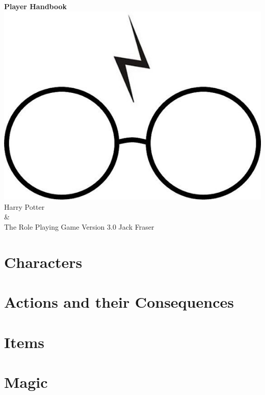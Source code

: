 \documentclass[oneside, twocolumn,9pt]{extbook}
\begin{document}
\begin{titlepage}
    \centering
    \vfill
    {\bfseries
        {\HP \fontsize{40}{35}\selectfont Player Handbook}
    }    
    \vfill
    \includegraphics[scale = 0.7]{../Images/glasses} %
    \vfill
    {\HP \fontsize{30}{24} \selectfont  Harry Potter \\\&\\ The Role Playing Game}
    \normalsize
    \vfill
    {\HP \fontsize{22}{0} \selectfont Version 3.0 \hfill Jack Fraser}
\end{titlepage}

\setcounter{tocdepth}{0}  
\begin{spacing}{0.8}
\footnotesize
\tableofcontents
\normalsize
\end{spacing}



\part{Characters} \label{C:CharacterCreation}


%



\part{Actions and their Consequences}







\part{Items}







\part{Magic}

\end{document}

